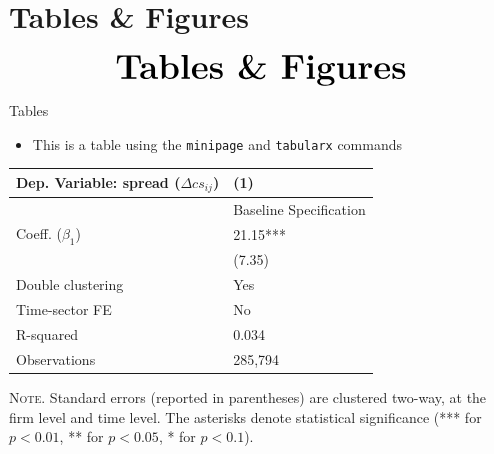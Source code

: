 \documentclass[10pt]{beamer}
\begin{document}

\section{Tables \& Figures}
\begin{frame}
	\begin{eqnarray*}
		&\text{{\Huge \textbf{Tables \& Figures}}}\\
	\end{eqnarray*}
\end{frame}


\begin{frame}
	{Tables}
	\begin{itemize}
		\item This is a table using the \texttt{minipage} and \texttt{tabularx} commands
	\end{itemize}
	\begin{table}[th]
		\centering%
		\begin{minipage}[b]{.5\textwidth}
			\vspace{.2cm}\tablesize
			\begin{tabularx}{\textwidth}{lY}
				\toprule
				Dep. Variable: spread ($\Delta cs_{ij}$) 	& (1)\\
				\midrule
				& {Baseline Specification} \\
				\midrule
				 Coeff. ($\beta_1$) 		&  21.15*** \\
				&   (7.35) \\
				\midrule
				 Double clustering 		& Yes \\
				Time-sector FE 												& No \\
				 R-squared 					& 0.034 \\
				Observations 												& 285,794 \\\bottomrule
			\end{tabularx}\vspace{.2cm}\newline
			\tiny{{\scshape Note.} Standard errors (reported in parentheses) are clustered two-way, at the firm level and time level. The asterisks denote statistical significance (*** for $p<0.01$, ** for $p<0.05$, * for $p<0.1$).\newline}%
			\label{tab:label}%
		\end{minipage}
	\end{table}
\end{frame}
\end{document}
